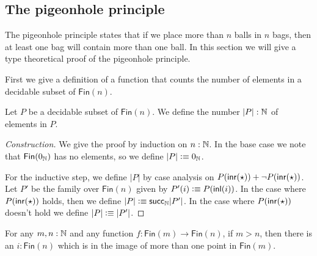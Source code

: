 \subsection{The pigeonhole principle}

The pigeonhole principle states that if we place more than $n$ balls in $n$ bags, then at least one bag will contain more than one ball. In this section we will give a type theoretical proof of the pigeonhole principle.

First we give a definition of a function that counts the number of elements in a decidable subset of $\mathsf{Fin}(n)$.

\begin{defn}
  Let $P$ be a decidable subset of $\mathsf{Fin}(n)$. We define the number $|P|:{\mathbb{N}}$ of elements in $P$.
\end{defn}

\begin{proof}[Construction]
  We give the proof by induction on $n:{\mathbb{N}}$. In the base case we note that $\mathsf{Fin}(0_{{\mathbb{N}}})$ has no elements, so we define $|P|\vcentcolon\equiv0_{{\mathbb{N}}}$.

  For the inductive step, we define $|P|$ by case analysis on $P({\mathsf{inr}}(\star))+\neg P({\mathsf{inr}}(\star))$. Let $P'$ be the family over $\mathsf{Fin}(n)$ given by $P'(i)\vcentcolon\equiv P({\mathsf{inl}}(i))$. In the case where $P({\mathsf{inr}}(\star))$ holds, then we define $|P|\vcentcolon\equiv \mathsf{succ}_{{\mathbb{N}}} |P'|$. In the case where $P({\mathsf{inr}}(\star))$ doesn't hold we define $|P|\vcentcolon\equiv |P'|$.
\end{proof}

\begin{thm}\label{thm:pigeonhole}
  For any $m,n:{\mathbb{N}}$ and any function $f:\mathsf{Fin}(m)\to\mathsf{Fin}(n)$, if $m>n$, then there is an $i:\mathsf{Fin}(n)$ which is in the image of more than one point in $\mathsf{Fin}(m)$.
\end{thm}

